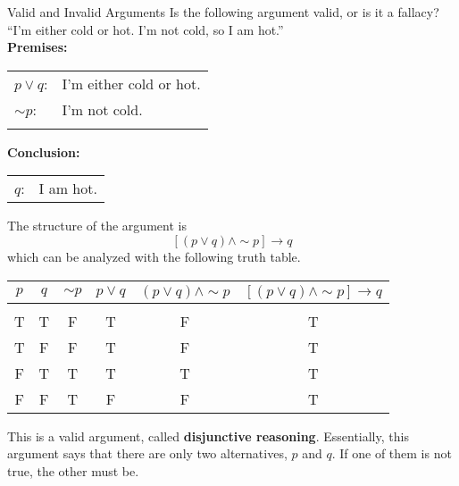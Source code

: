 \begin{example}[https://www.youtube.com/watch?v=6DtnGoYXgjY]{Valid and Invalid Arguments}
Is the following argument valid, or is it a fallacy?\\

``I'm either cold or hot.  I'm not cold, so I am hot.''\\

\textbf{Premises:}\\
\begin{tabular}{l l}
$p \vee q$: & I'm either cold or hot.\\
$\sim p$: & I'm not cold.\\
& \\
\end{tabular}

\textbf{Conclusion:}\\
\begin{tabular}{l l}
$q$: & I am hot.
\end{tabular}

The structure of the argument is \[[(p \vee q) \wedge \sim p] \to q\]
which can be analyzed with the following truth table.
\begin{center}
\begin{tabular}{|c c c c c c|}
\hline
$p$ & $q$ & $\sim p$ & $p \vee q$ & $(p \vee q) \wedge \sim p$ & $[(p \vee q) \wedge \sim p] \to q$\\
\hline
& & & & & \\
T & T & F & T & F & T\\
T & F & F & T & F & T\\
F & T & T & T & T & T\\
F & F & T & F & F & T\\
\hline
\end{tabular}
\end{center}

This is a valid argument, called \textbf{disjunctive reasoning}.  Essentially, this argument says that there are only two alternatives, $p$ and $q$.  If one of them is not true, the other must be.
\end{example}


